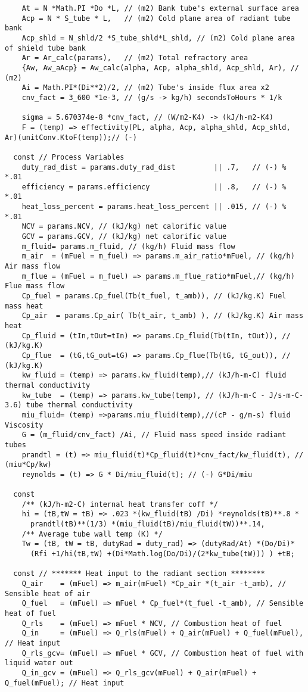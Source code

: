 \begin{verbatim}
    At = N *Math.PI *Do *L, // (m2) Bank tube's external surface area
    Acp = N * S_tube * L,   // (m2) Cold plane area of radiant tube bank
    Acp_shld = N_shld/2 *S_tube_shld*L_shld, // (m2) Cold plane area of shield tube bank
    Ar = Ar_calc(params),   // (m2) Total refractory area
    {Aw, Aw_aAcp} = Aw_calc(alpha, Acp, alpha_shld, Acp_shld, Ar), // (m2)
    Ai = Math.PI*(Di**2)/2, // (m2) Tube's inside flux area x2
    cnv_fact = 3_600 *1e-3, // (g/s -> kg/h) secondsToHours * 1/k

    sigma = 5.670374e-8 *cnv_fact, // (W/m2-K4) -> (kJ/h-m2-K4)
    F = (temp) => effectivity(PL, alpha, Acp, alpha_shld, Acp_shld, Ar)(unitConv.KtoF(temp));// (-)

  const // Process Variables
    duty_rad_dist = params.duty_rad_dist         || .7,   // (-) % *.01
    efficiency = params.efficiency               || .8,   // (-) % *.01
    heat_loss_percent = params.heat_loss_percent || .015, // (-) % *.01
    NCV = params.NCV, // (kJ/kg) net calorific value
    GCV = params.GCV, // (kJ/kg) net calorific value
    m_fluid= params.m_fluid, // (kg/h) Fluid mass flow
    m_air  = (mFuel = m_fuel) => params.m_air_ratio*mFuel, // (kg/h) Air mass flow
    m_flue = (mFuel = m_fuel) => params.m_flue_ratio*mFuel,// (kg/h) Flue mass flow
    Cp_fuel = params.Cp_fuel(Tb(t_fuel, t_amb)), // (kJ/kg.K) Fuel mass heat
    Cp_air  = params.Cp_air( Tb(t_air, t_amb) ), // (kJ/kg.K) Air mass heat
    Cp_fluid = (tIn,tOut=tIn) => params.Cp_fluid(Tb(tIn, tOut)), // (kJ/kg.K)
    Cp_flue  = (tG,tG_out=tG) => params.Cp_flue(Tb(tG, tG_out)), // (kJ/kg.K)
    kw_fluid = (temp) => params.kw_fluid(temp),// (kJ/h-m-C) fluid thermal conductivity
    kw_tube  = (temp) => params.kw_tube(temp), // (kJ/h-m-C - J/s-m-C-3.6) tube thermal conductivity
    miu_fluid= (temp) =>params.miu_fluid(temp),//(cP - g/m-s) fluid Viscosity
    G = (m_fluid/cnv_fact) /Ai, // Fluid mass speed inside radiant tubes
    prandtl = (t) => miu_fluid(t)*Cp_fluid(t)*cnv_fact/kw_fluid(t), // (miu*Cp/kw)
    reynolds = (t) => G * Di/miu_fluid(t); // (-) G*Di/miu
  
  const 
    /** (kJ/h-m2-C) internal heat transfer coff */
    hi = (tB,tW = tB) => .023 *(kw_fluid(tB) /Di) *reynolds(tB)**.8 *
      prandtl(tB)**(1/3) *(miu_fluid(tB)/miu_fluid(tW))**.14,
    /** Average tube wall temp (K) */
    Tw = (tB, tW = tB, dutyRad = duty_rad) => (dutyRad/At) *(Do/Di)* 
      (Rfi +1/hi(tB,tW) +(Di*Math.log(Do/Di)/(2*kw_tube(tW))) ) +tB;

  const // ******* Heat input to the radiant section ********
    Q_air    = (mFuel) => m_air(mFuel) *Cp_air *(t_air -t_amb), // Sensible heat of air
    Q_fuel   = (mFuel) => mFuel * Cp_fuel*(t_fuel -t_amb), // Sensible heat of fuel
    Q_rls    = (mFuel) => mFuel * NCV, // Combustion heat of fuel
    Q_in     = (mFuel) => Q_rls(mFuel) + Q_air(mFuel) + Q_fuel(mFuel), // Heat input
    Q_rls_gcv= (mFuel) => mFuel * GCV, // Combustion heat of fuel with liquid water out
    Q_in_gcv = (mFuel) => Q_rls_gcv(mFuel) + Q_air(mFuel) + Q_fuel(mFuel); // Heat input
  

\end{verbatim}
